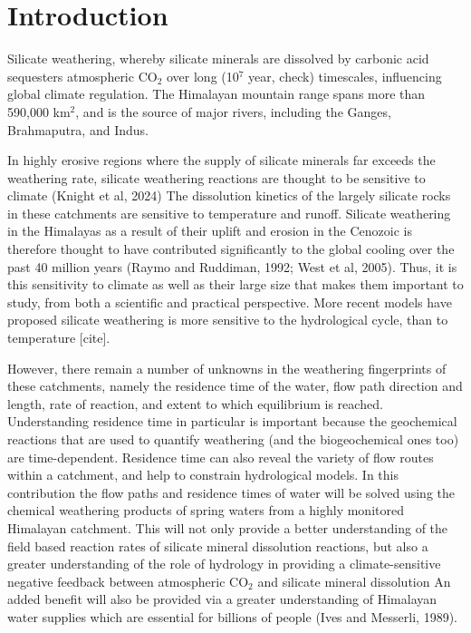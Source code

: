 
\section{Introduction}



Silicate weathering, whereby silicate minerals are dissolved by carbonic acid 
sequesters atmospheric CO$_2$ over long (10$^7$ year, check) timescales, influencing global climate regulation.
The Himalayan mountain range spans more than 590,000 km$^2$, and is the source of major rivers, including the Ganges, Brahmaputra, and Indus. 


\bsk

In highly erosive regions where the supply of silicate minerals far exceeds the weathering rate, silicate weathering reactions are thought to be sensitive to climate (Knight et al, 2024) The dissolution kinetics of the largely silicate rocks in these catchments are sensitive to temperature and runoff. Silicate weathering in the Himalayas as a result of their uplift and erosion in the Cenozoic is therefore thought to have contributed significantly to the global 
cooling over the past 40 million years %
(Raymo and Ruddiman, 1992; West et al, 2005). 
Thus, it is this sensitivity to climate as well as their large size that makes them important to study, from both a scientific and practical perspective. More recent models have proposed silicate weathering is more sensitive to the hydrological cycle, than to temperature [cite].

\bsk

However, there remain a number of unknowns in the weathering fingerprints of these catchments, namely the residence time of the water,
flow path direction and length, rate of reaction, and extent to which equilibrium is reached.
Understanding residence time in particular is important because the geochemical reactions that are used to quantify weathering 
(and the biogeochemical ones too) are time-dependent.
Residence time can also reveal the variety of flow routes within a catchment, and help to constrain hydrological models. In this contribution the flow paths and residence times of water will be solved using the chemical weathering products of spring waters from a highly monitored Himalayan catchment. This will not only provide a better understanding of the field based reaction rates of silicate mineral dissolution reactions, but also a greater understanding of the role of hydrology in providing a climate-sensitive negative feedback between atmospheric CO$_2$ and silicate mineral dissolution
An added benefit will also be provided via a greater understanding of Himalayan water supplies which are essential for billions of people (Ives and Messerli, 1989). 

